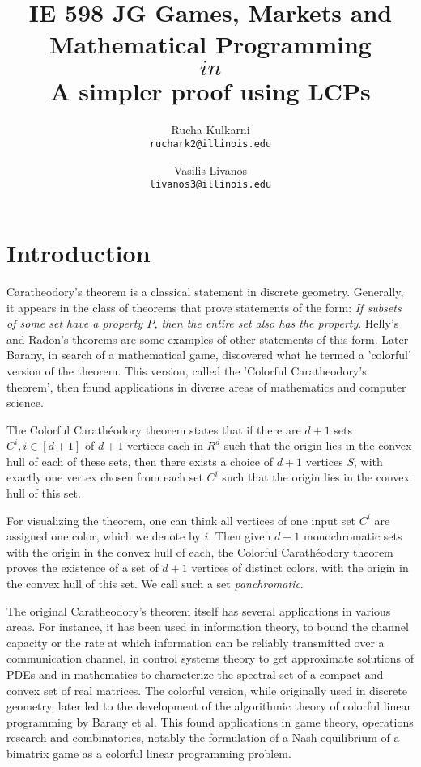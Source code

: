 \documentclass[a4paper,11pt]{article}
\title{IE 598 JG Games, Markets and Mathematical Programming \\ \CCP $in$ \PPAD \\ A simpler proof using LCPs}
\author{
	{\sc Rucha Kulkarni} \\
	\texttt{ruchark2@illinois.edu}
	\and
	{\sc Vasilis Livanos} \\
	\texttt{livanos3@illinois.edu}
}
\date{}
\def\CC{Colorful Carath\'eodory }
\begin{document}
 \maketitle

\section{Introduction}

Caratheodory's theorem is a classical statement in discrete geometry\cite{CP07}. Generally, it appears in the class of theorems that prove statements of the form: \textit{If subsets of some set have a property $P$, then the entire set also has the property}. Helly's and Radon's theorems are some examples of other statements of this form. Later Barany\cite{IB}, in search of a mathematical game, discovered what he termed a 'colorful' version of the theorem. This version, called the 'Colorful Caratheodory's theorem', then found applications in diverse areas of mathematics and computer science. 

The \CC theorem states that if there are $d+1$ sets $C^i, i \in [d+1]$ of $d+1$ vertices each in $R^d$ such that the origin lies in the convex hull of each of these sets, then there exists a choice of $d+1$ vertices $S$, with exactly one vertex chosen from each set $C^i$ such that the origin lies in the convex hull of this set.

For visualizing the theorem, one can think all vertices of one input set $C^i$ are assigned one color,
which we denote by $i$. Then given $d+1$ monochromatic sets with the origin in the convex hull of each, the
\CC theorem proves the existence of a set of $d+1$ vertices of distinct colors, with the origin in the convex
hull of this set. We call such a set \textit{panchromatic}.

The original Caratheodory's theorem itself has several applications in various areas. For instance, it has been used in information theory\cite{CP_App1}, to bound the channel capacity or the rate at which information can be reliably transmitted over a communication channel, in control systems theory to get approximate solutions of PDEs\cite{CP_App3} and in mathematics to characterize the spectral set of a compact and convex set of real matrices\cite{CP_App2}. The colorful version, while originally used in discrete geometry, later led to the development of the algorithmic theory of colorful linear programming by Barany et al\cite{CCP_Apps}. This found applications in game theory, operations research and combinatorics, notably the formulation of a Nash equilibrium of a bimatrix game as a colorful linear programming problem. 
\end{document}
